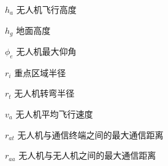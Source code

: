 \begin{denotation}[3cm]
\item[$h_a$] 无人机飞行高度
\item[$h_g$] 地面高度
\item[$\phi_e$] 无人机最大仰角
\item[$r_i$] 重点区域半径
\item[$r_t$] 无人机转弯半径
\item[$v_a$] 无人机平均飞行速度
\item[$r_{at}$] 无人机与通信终端之间的最大通信距离
\item[$r_{aa}$] 无人机与无人机之间的最大通信距离



\end{denotation}

